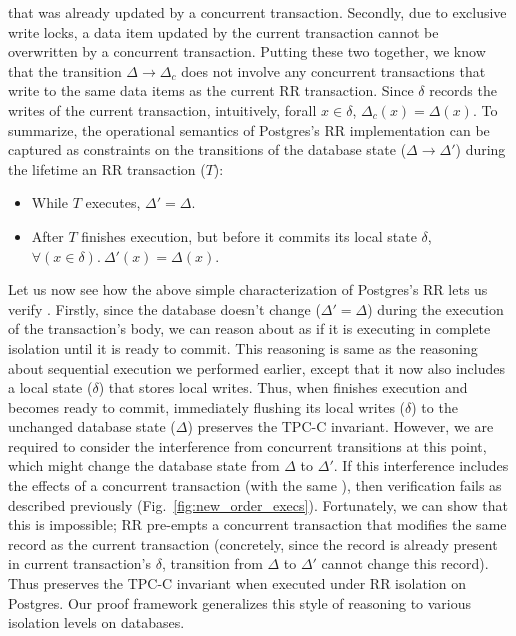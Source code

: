 that was already updated by a concurrent transaction. Secondly, due to
exclusive write locks, a data item updated by the current transaction
cannot be overwritten by a concurrent transaction. Putting these two
together, we know that the transition $\Delta \longrightarrow
\Delta_c$ does not involve any concurrent transactions that write to
the same data items as the current RR transaction. Since $\delta$
records the writes of the current transaction, intuitively, forall
$x\in\delta$, $\Delta_c(x) = \Delta(x)$. To summarize, the operational
semantics of Postgres's RR implementation can be captured as
constraints on the transitions of the database state ($\Delta
\longrightarrow \Delta'$) during the lifetime an RR
transaction ($T$):
\begin{itemize}
  \item While $T$ executes, $\Delta' = \Delta$.
  \item After $T$ finishes execution, but before it commits its local
    state $\delta$, $\forall(x\in\delta).~\Delta'(x) = \Delta(x)$.
\end{itemize}

Let us now see how the above simple characterization of Postgres's RR
lets us verify . Firstly, since the database doesn't
change ($\Delta' = \Delta$) during the execution of the transaction's
body, we can reason about  as if it is executing in
complete isolation until it is ready to commit. This reasoning is same
as the reasoning about sequential execution we performed earlier,
except that it now also includes a local state ($\delta$) that stores
local writes. Thus, when  finishes execution and becomes
ready to commit, immediately flushing its local writes ($\delta$) to
the unchanged database state ($\Delta$) preserves the TPC-C invariant.
However, we are required to consider the  interference from concurrent
transitions at this point, which might change the database state from
$\Delta$ to $\Delta'$. If this interference includes the effects of a
concurrent  transaction (with the same ), then
verification fails as described previously
(Fig.~\ref{fig:new_order_execs}). Fortunately, we can show that this
is impossible; RR pre-empts a concurrent  transaction
that modifies the same  record as the current transaction
(concretely, since the record is already present in current
transaction's $\delta$, transition from $\Delta$ to $\Delta'$ cannot
change this record). Thus  preserves the TPC-C
invariant when executed under RR isolation on Postgres. Our proof
framework generalizes this style of reasoning to various isolation
levels on databases.

